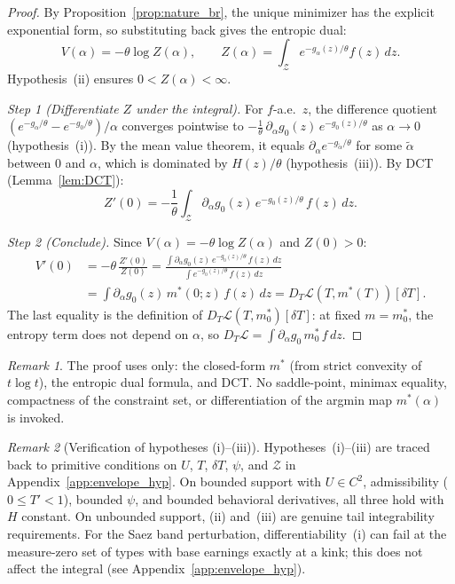 \documentclass[12pt,a4paper]{article}
\theoremstyle{definition}
\theoremstyle{plain}
\theoremstyle{remark}
\newtheorem{remark}{Remark}[section]
\newcommand{\calZ}{\mathcal{Z}}
\newcommand{\calL}{\mathcal{L}}
\begin{document}
\begin{proof}
By Proposition~\ref{prop:nature_br}, the unique minimizer
has the explicit exponential form, so substituting back
gives the entropic dual:
\[
  V(\alpha)
  = -\theta\log Z(\alpha),
  \qquad
  Z(\alpha) = \int_\calZ e^{-g_\alpha(z)/\theta}
  f(z)\,dz.
\]
Hypothesis~(ii) ensures $0 < Z(\alpha) < \infty$.

\emph{Step 1 (Differentiate $Z$ under the integral).}
For $f$-a.e.\ $z$, the difference quotient
$(e^{-g_\alpha/\theta}
- e^{-g_0/\theta})/\alpha$
converges pointwise to
$-\frac{1}{\theta}\,\partial_\alpha g_0(z)\,
e^{-g_0(z)/\theta}$
as $\alpha \to 0$ (hypothesis~(i)).  By the mean value
theorem, it equals
$\partial_\alpha e^{-g_{\tilde\alpha}/\theta}$ for
some $\tilde\alpha$ between $0$ and $\alpha$, which is
dominated by $H(z)/\theta$ (hypothesis~(iii)).  By DCT
(Lemma~\ref{lem:DCT}):
\[
  Z'(0) = -\frac{1}{\theta}
  \int_\calZ \partial_\alpha g_0(z)\,
  e^{-g_0(z)/\theta}\,f(z)\,dz.
\]

\emph{Step 2 (Conclude).}
Since $V(\alpha) = -\theta\log Z(\alpha)$ and
$Z(0) > 0$:
\begin{align*}
  V'(0)
  &= -\theta\,\frac{Z'(0)}{Z(0)}
  = \frac{\int \partial_\alpha g_0(z)\,
    e^{-g_0(z)/\theta}\,f(z)\,dz}
    {\int e^{-g_0(z)/\theta}\,f(z)\,dz} \\
  &= \int \partial_\alpha g_0(z)\,m^*(0;z)\,
    f(z)\,dz
  = D_T\calL(T, m^*(T))[\delta T].
\end{align*}
The last equality is the definition of
$D_T\calL(T,m^*_0)[\delta T]$: at fixed $m = m^*_0$,
the entropy term does not depend on $\alpha$, so
$D_T\calL = \int \partial_\alpha g_0\,m^*_0\,f\,dz$.
\end{proof}

\begin{remark}
\label{rem:no_minimax}
The proof uses only: the closed-form $m^*$ (from strict
convexity of $t\log t$), the entropic dual formula, and
DCT\@.  No saddle-point, minimax equality, compactness
of the constraint set, or differentiation of the argmin
map $m^*(\alpha)$ is invoked.
\end{remark}

\begin{remark}[Verification of hypotheses (i)--(iii)]
\label{rem:integrability}
Hypotheses~(i)--(iii) are traced back to primitive
conditions on $U$, $T$, $\delta T$, $\psi$, and $\calZ$
in Appendix~\ref{app:envelope_hyp}.  On bounded support
with $U \in C^2$, admissibility ($0 \leq T' < 1$),
bounded $\psi$, and bounded behavioral derivatives,
all three hold with $H$ constant.
On unbounded support, (ii) and~(iii) are genuine tail
integrability requirements.
For the Saez band perturbation, differentiability~(i)
can fail at the measure-zero set of types with base
earnings exactly at a kink; this does not affect the
integral (see Appendix~\ref{app:envelope_hyp}).
\end{remark}
\end{document}
